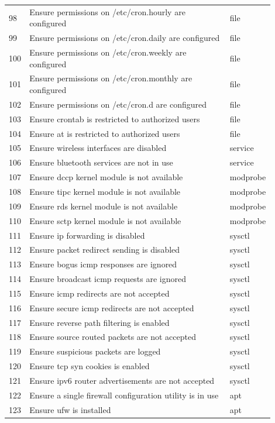 \begin{longtable}{|p{0.05\linewidth}|p{0.75\linewidth}|p{0.1\linewidth}|}
98 & Ensure permissions on /etc/cron.hourly are configured & file \\
99 & Ensure permissions on /etc/cron.daily are configured & file \\
100 & Ensure permissions on /etc/cron.weekly are configured & file \\
101 & Ensure permissions on /etc/cron.monthly are configured & file \\
102 & Ensure permissions on /etc/cron.d are configured & file \\
103 & Ensure crontab is restricted to authorized users & file \\
104 & Ensure at is restricted to authorized users & file \\
105 & Ensure wireless interfaces are disabled & service \\
106 & Ensure bluetooth services are not in use & service \\
107 & Ensure dccp kernel module is not available & modprobe \\
108 & Ensure tipc kernel module is not available & modprobe \\
109 & Ensure rds kernel module is not available & modprobe \\
110 & Ensure sctp kernel module is not available & modprobe \\
111 & Ensure ip forwarding is disabled & sysctl \\
112 & Ensure packet redirect sending is disabled & sysctl \\
113 & Ensure bogus icmp responses are ignored & sysctl \\
114 & Ensure broadcast icmp requests are ignored & sysctl \\
115 & Ensure icmp redirects are not accepted & sysctl \\
116 & Ensure secure icmp redirects are not accepted & sysctl \\
117 & Ensure reverse path filtering is enabled & sysctl \\
118 & Ensure source routed packets are not accepted & sysctl \\
119 & Ensure suspicious packets are logged & sysctl \\
120 & Ensure tcp syn cookies is enabled & sysctl \\
121 & Ensure ipv6 router advertisements are not accepted & sysctl \\
122 & Ensure a single firewall configuration utility is in use & apt \\
123 & Ensure ufw is installed & apt \\

\end{longtable}
